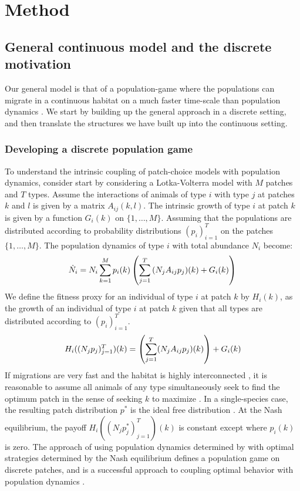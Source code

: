 \section{Method}

\subsection{General continuous model and the discrete motivation}
\label{sec:gen_model}

Our general model is that of a population-game \citep{kvrivan2009evolutionary} where the populations can migrate in a continuous habitat on a much faster time-scale than population dynamics \citep{cressman2006migration}. We start by building up the general approach in a discrete setting, and then translate the structures we have built up into the continuous setting.

\subsubsection{Developing a discrete population game}
To understand the intrinsic coupling of patch-choice models with population dynamics, consider start by considering a Lotka-Volterra model with $M$ patches and $T$ types. Assume the interactions of animals of type $i$ with type $j$ at patches $k$ and $l$ is given by a matrix $A_{ij}(k,l)$. The intrinsic growth of type $i$ at patch $k$ is given by a function $G_{i}(k)$ on $\{1,\dots,M\}$. Assuming that the populations are distributed according to probability distributions $(p_i)_{i=1}^T$ on the patches $\{1,\ldots,M\}$. The population dynamics of type $i$ with total abundance $N_i$ become:
  \begin{equation}
  \dot{N}_i = N_i \sum_{k=1}^M p_i(k) \left ( \sum_{j=1}^T {(N_j A_{ij} p_j)}(k) + G_i(k) \right )
  \label{eq:pop_dyn_lv}
\end{equation}
We define the fitness proxy for an individual of type $i$ at patch $k$ by $H_i(k)$, as the growth of an individual of type $i$ at patch $k$ given that all types are distributed according to $(p_i)_{i=1}^T$.
\begin{equation}
  H_i((N_j p_j)_{j=1}^T)(k) = \pa{\sum_{j=1}^T (N_j A_{ij}p_j)(k)} + G_i(k)%
  \label{eq:utility_pm}
\end{equation}
If migrations are very fast and the habitat is highly interconnected \citep{cressman2006migration, abrams2007role}, it is reasonable to assume all animals of any type simultaneously seek to find the optimum patch in the sense of seeking $k$ to maximize . In a single-species case, the resulting patch distribution $p^*$ is the ideal free distribution \citep{fretwell1969territorial}. At the Nash equilibrium, the payoff $H_i((N_j p_j^*)_{j=1}^T)(k)$ is constant except where $p_i(k)$ is zero. The approach of using population dynamics determined by  with optimal strategies determined by the Nash equilibrium defines a population game on discrete patches, and is a successful approach to coupling optimal behavior with population dynamics \citep{valdovinos2010consequences, mougi2019adaptive, pinti2021co}.


